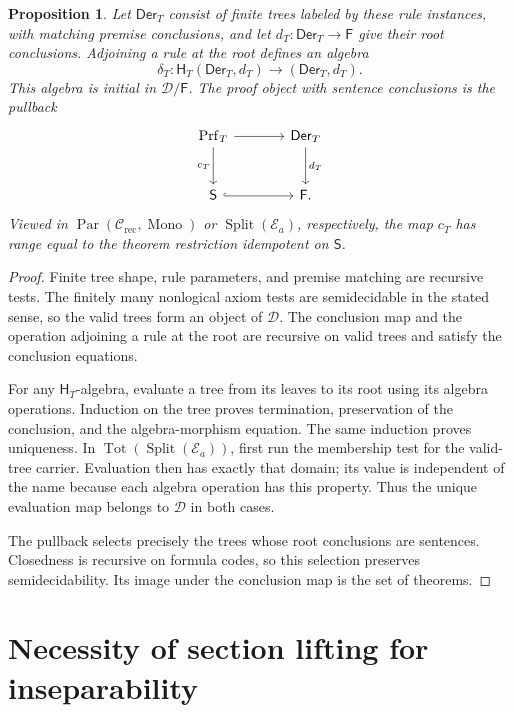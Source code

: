 \documentclass[11pt]{article}
\newtheorem{proposition}[theorem]{Proposition}
\begin{document}
\begin{proposition}\label{prop:first-order-proof-initial}
Let $\mathsf{Der}_T$ consist of finite trees labeled by these rule
instances, with matching premise conclusions, and let
$d_T:\mathsf{Der}_T\to\mathsf F$ give their root conclusions.
Adjoining a rule at the root defines an algebra
\[
 \delta_T:\mathsf H_T(\mathsf{Der}_T,d_T)
       \longrightarrow(\mathsf{Der}_T,d_T).
\]
This algebra is initial in $\mathcal D/\mathsf F$.
The proof object with sentence conclusions is the pullback
\[
\begin{tikzcd}[column sep=large,row sep=large]
 \mathrm{Prf}_T \arrow[r] \arrow[d,"c_T"'] &
 \mathsf{Der}_T \arrow[d,"d_T"] \\
 \mathsf S \arrow[r,hook] & \mathsf F.
\end{tikzcd}
\]
Viewed in $\operatorname{Par}(\mathcal C_{\mathrm{rec}},\operatorname{Mono})$
or $\operatorname{Split}(\mathcal E_a)$, respectively, the map $c_T$
has range equal to the theorem restriction idempotent on $\mathsf S$.
\end{proposition}
\begin{proof}
Finite tree shape, rule parameters, and premise matching are recursive
tests. The finitely many nonlogical axiom tests are semidecidable in
the stated sense, so the valid trees form an object of $\mathcal D$.
The conclusion map and the operation adjoining a rule at the root are
recursive on valid trees and satisfy the conclusion equations.

For any $\mathsf H_T$-algebra, evaluate a tree from its leaves to
its root using its algebra operations. Induction on the tree proves
termination, preservation of the conclusion, and the algebra-morphism
equation. The same induction proves uniqueness. In
$\operatorname{Tot}(\operatorname{Split}(\mathcal E_a))$, first run the
membership test for the valid-tree carrier. Evaluation then has exactly
that domain; its value is independent of the name because each algebra
operation has this property. Thus the unique evaluation map belongs to
$\mathcal D$ in both cases.

The pullback selects precisely the trees whose root conclusions are
sentences. Closedness is recursive on formula codes, so this selection
preserves semidecidability. Its image under the conclusion map is the
set of theorems.
\end{proof}

\section{Necessity of section lifting for inseparability}
\label{app:lifting-counterexample}
\end{document}
